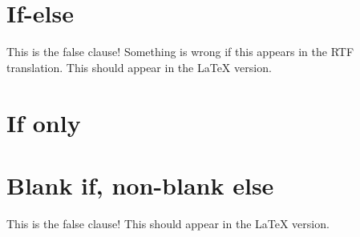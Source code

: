 \documentclass[11pt]{report}
\newif\iflatextortf  %
\begin{document}
\section{If-else}

\iflatextortf
  This is the true clause!  There should be no false clause.
\else
  This is the false clause!  Something is wrong if this appears in the RTF translation.
  This should appear in the \LaTeX{} version.
\fi

\section{If only}

\iflatextortf
  This is the true clause, with no else clause. It should not appear in the \LaTeX{} version.
\fi

\section{Blank if, non-blank else}

\iflatextortf
\else
  This is the false clause!
  This should appear in the \LaTeX{} version.
\fi

%
%


\end{document}
